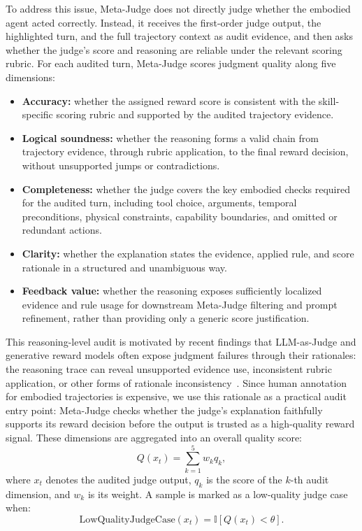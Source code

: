 To address this issue, Meta-Judge does not directly judge whether the embodied agent acted correctly. Instead, it receives the first-order judge output, the highlighted turn, and the full trajectory context as audit evidence, and then asks whether the judge's score and reasoning are reliable under the relevant scoring rubric. For each audited turn, Meta-Judge scores judgment quality along five dimensions:
\begin{itemize}
    \item \textbf{Accuracy:} whether the assigned reward score is consistent with the skill-specific scoring rubric and supported by the audited trajectory evidence.
    \item \textbf{Logical soundness:} whether the reasoning forms a valid chain from trajectory evidence, through rubric application, to the final reward decision, without unsupported jumps or contradictions.
    \item \textbf{Completeness:} whether the judge covers the key embodied checks required for the audited turn, including tool choice, arguments, temporal preconditions, physical constraints, capability boundaries, and omitted or redundant actions.
    \item \textbf{Clarity:} whether the explanation states the evidence, applied rule, and score rationale in a structured and unambiguous way.
    \item \textbf{Feedback value:} whether the reasoning exposes sufficiently localized evidence and rule usage for downstream Meta-Judge filtering and prompt refinement, rather than providing only a generic score justification.
\end{itemize}

This reasoning-level audit is motivated by recent findings that LLM-as-Judge and generative reward models often expose judgment failures through their rationales: the reasoning trace can reveal unsupported evidence use, inconsistent rubric application, or other forms of rationale inconsistency~\citep{wang2026outcome}. Since human annotation for embodied trajectories is expensive, we use this rationale as a practical audit entry point: Meta-Judge checks whether the judge's explanation faithfully supports its reward decision before the output is trusted as a high-quality reward signal. These dimensions are aggregated into an overall quality score:
\begin{equation}
Q(x_t)=\sum_{k=1}^{5} w_k q_k,
\label{eq:meta_quality}
\end{equation}
where $x_t$ denotes the audited judge output, $q_k$ is the score of the $k$-th audit dimension, and $w_k$ is its weight. A sample is marked as a low-quality judge case when:
\begin{equation}
\mathrm{LowQualityJudgeCase}(x_t)=\mathbb{I}[Q(x_t)<\theta].
\label{eq:low_quality_case}
\end{equation}

